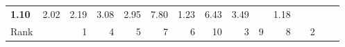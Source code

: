 \begin{tabular}{ll|rrrrrr|rrrrrrr}
  


  
  \textbf{1.10} & 2.02 & 2.19 & 3.08 & 2.95 & 7.80 & 1.23 & 6.43 & 3.49 &  & 1.18 \\

  Rank & &
  1 & 4 & 5 & 7 & 6 & 10 & 3 & 9 & 8 &  & 2 \\\hline\hline
  

\end{tabular}
